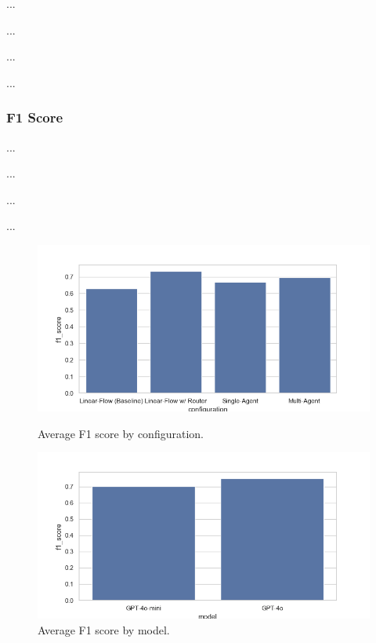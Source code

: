             ...

            ...
            
            ...

            ...
        
            \subsubsection{F1 Score}
            
                
                ...

                ...

                ...

                ...
                
                \begin{figure}[h]
                \centering
                \begin{minipage}{0.45\textwidth}
                    \centering
                    \includegraphics[width=\textwidth]{images_exp2/bar_avg_f1_by_configuration.png}
                    \caption{Average F1 score by configuration.}
                    \label{fig:bar_avg_f1_by_configuration}
                \end{minipage}
                \hfill
                \begin{minipage}{0.45\textwidth}
                    \centering
                    \includegraphics[width=\textwidth]{images_exp2/bar_avg_f1_by_model.png}
                    \caption{Average F1 score by model.}
                    \label{fig:bar_avg_f1_by_model}
                \end{minipage}
                \end{figure}
                
